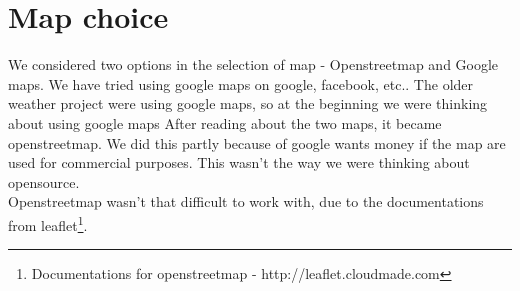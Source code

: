 \chapter{Map choice}
We considered two options in the selection of map - Openstreetmap and Google maps. We have tried using google maps on google, facebook, etc.. The older weather project were using google maps, so at the beginning we were thinking about using google maps
After reading about the two maps, it became openstreetmap. We did this partly because of google wants money if the map are used for commercial purposes. This wasn't the way we were thinking about opensource.\\
Openstreetmap wasn't that difficult to work with, due to the documentations from leaflet\footnote{Documentations for openstreetmap - http://leaflet.cloudmade.com}.